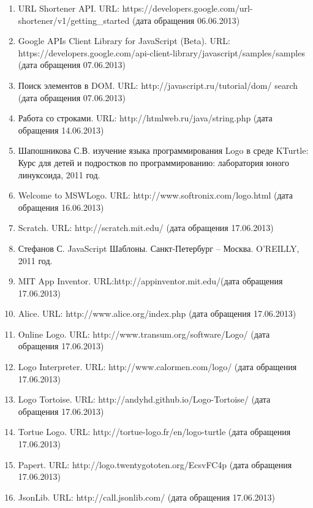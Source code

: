 \begin{enumerate}
\item	URL Shortener API. URL: https://developers.google.com/url-shortener/v1/getting\_started (дата обращения 06.06.2013)
\item	Google APIs Client Library for JavaScript (Beta). URL: https://developers.google.com/api-client-library/javascript/samples/samples (дата обращения 07.06.2013)
\item	Поиск элементов в DOM. URL: http://javascript.ru/tutorial/dom/ search (дата обращения 07.06.2013)
\item	Работа со строками. URL: http://htmlweb.ru/java/string.php (дата обращения 14.06.2013)
\item	Шапошникова С.В. изучение языка программирования Logo в среде KTurtle: Курс для детей и подростков по программированию: лаборатория юного линуксоида, 2011 год.
\item	Welcome to MSWLogo. URL: http://www.softronix.com/logo.html (дата обращения 16.06.2013)
\item	Scratch. URL: http://scratch.mit.edu/ (дата обращения 17.06.2013)
\item	Стефанов С. JavaScript Шаблоны. Санкт-Петербург  –  Москва. O'REILLY, 2011 год.
\item	MIT App Inventor. URL:http://appinventor.mit.edu/(дата обращения 17.06.2013)
\item	Alice. URL: http://www.alice.org/index.php (дата обращения 17.06.2013)
\item	Online Logo. URL: http://www.transum.org/software/Logo/ (дата обращения 17.06.2013)
\item	Logo Interpreter. URL: http://www.calormen.com/logo/ (дата обращения 17.06.2013)
\item	Logo Tortoise. URL: http://andyhd.github.io/Logo-Tortoise/ (дата обращения 17.06.2013)
\item	Tortue Logo. URL: http://tortue-logo.fr/en/logo-turtle (дата обращения 17.06.2013)
\item	Papert. URL: http://logo.twentygototen.org/EcsvFC4p (дата обращения 17.06.2013)
\item	JsonLib. URL: http://call.jsonlib.com/ (дата обращения 17.06.2013)
\end{enumerate}